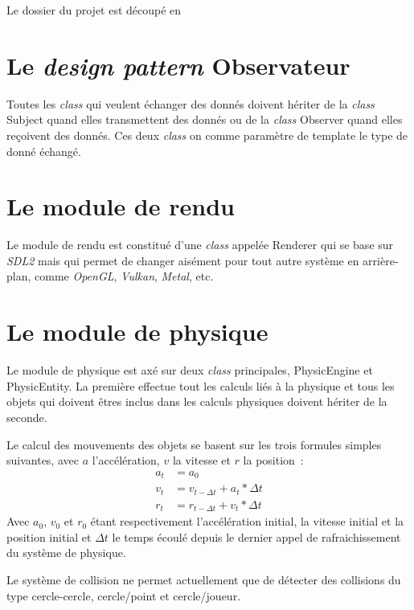 \documentclass[10pt, french, a4paper]{report}
\newcommand{\class}[1]{{\codefont \NoAutoSpacing \mbox{#1}}}
\begin{document}
Le dossier du projet est découpé en


\section{Le \textit{design pattern} Observateur}

Toutes les \textit{class} qui veulent échanger des donnés doivent hériter de la 
\textit{class} \class{Subject} quand elles transmettent des donnés ou de la 
\textit{class} \class{Observer} quand elles reçoivent des donnés. Ces deux \textit{class} on comme paramètre de template le type de donné échangé.

\section{Le module de rendu}

Le module de rendu est constitué d'une \textit{class} appelée \class{Renderer} qui 
se base sur \textit{SDL2} mais qui permet de changer aisément pour tout autre 
système en arrière-plan, comme \textit{OpenGL}, \textit{Vulkan}, \textit{Metal}, etc. 


\section{Le module de physique}

Le module de physique est axé sur deux \textit{class} principales, 
\class{PhysicEngine} et \\ \class{PhysicEntity}. 
La première effectue tout les calculs liés à la physique et 
tous les objets qui doivent êtres inclus dans les calculs physiques doivent hériter
de la seconde.

Le calcul des mouvements des objets se basent sur les trois formules simples suivantes,
avec $a$ l'accélération, $v$ la vitesse et $r$ la position~:
\begin{align}
	a_t &= a_0\\
	v_t &= v_{t-\Delta t} + a_t * \Delta t\\
	r_t &= r_{t-\Delta t} + v_t * \Delta t
\end{align}
Avec $a_0$, $v_0$ et $r_0$ étant respectivement l'accélération initial, la vitesse 
initial et la position initial et $\Delta t$ le temps écoulé depuis le dernier 
appel de rafraichissement du système de physique.

Le système de collision ne permet actuellement que de détecter des collisions du type
cercle-cercle, cercle/point et cercle/joueur.
\end{document}

